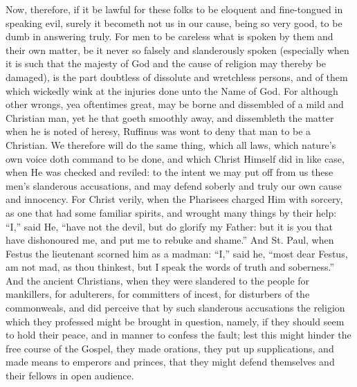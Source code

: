 Now, therefore, if it be lawful for these folks to be eloquent and
fine-tongued in speaking evil, surely it becometh not us in our cause,
being so very good, to be dumb in answering truly. For men to
be careless what is spoken by them and their own matter, be it never
so falsely and slanderously spoken (especially when it is such that
the majesty of God and the cause of religion may thereby be damaged),
is the part doubtless of dissolute and wretchless persons, and of them
which wickedly wink at the injuries done unto the Name of God.
For although other wrongs, yea oftentimes great, may be borne and dissembled
of a mild and Christian man, yet he that goeth smoothly away, and dissembleth
the matter when he is noted of heresy, Ruffinus was wont to deny that
man to be a Christian. We therefore will do the same thing, which
all laws, which nature’s own voice doth command to be done, and
which Christ Himself did in like case, when He was checked and reviled:
to the intent we may put off from us these men’s slanderous accusations,
and may defend soberly and truly our own cause and innocency.
For
Christ verily, when the Pharisees charged Him with sorcery, as one that
had some familiar spirits, and wrought many things by their help: “I,”
said He, “have not the devil, but do glorify my Father: but it
is you that have dishonoured me, and put me to rebuke and shame.”
And St. Paul, when Festus the lieutenant scorned him as a madman: “I,”
said he, “most dear Festus, am not mad, as thou thinkest, but
I speak the words of truth and soberness.” And the ancient
Christians, when they were slandered to the people for mankillers, for
adulterers, for committers of incest, for disturbers of the commonweals,
and did perceive that by such slanderous accusations the religion which
they professed might be brought in question, namely, if they should
seem to hold their peace, and in manner to confess the fault; lest this
might hinder the free course of the Gospel, they made orations, they
put up supplications, and made means to emperors and princes, that they
might defend themselves and their fellows in open audience.

